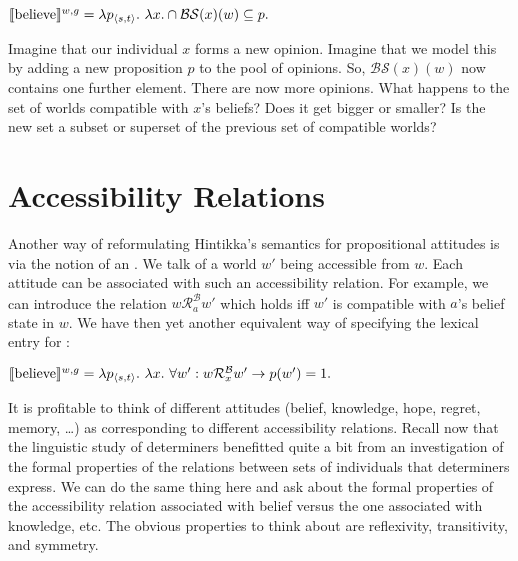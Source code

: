 \ex $\llbracket \mbox{believe} \rrbracket^{w,g} = \lambda p_{\langle s,t \rangle}.\ \lambda x. \cap
\mathcal{BS}(x)(w) \subseteq p.$ \xe

\begin{exercise}
	
	Imagine that our individual $x$ forms a new opinion. Imagine that we model
  this by adding a new proposition $p$ to the pool of opinions. So,
  $\mathcal{BS}(x)(w)$ now contains one further element. There are now more
  opinions. What happens to the set of worlds compatible with $x$'s beliefs?
  Does it get bigger or smaller? Is the new set a subset or superset of the
  previous set of compatible worlds? \eex
\end{exercise}

\section{Accessibility Relations} \label{sec:access-relat}

Another way of reformulating Hintikka's semantics for propositional attitudes is
via the notion of an . We talk of a world $w'$
being accessible from $w$. Each attitude can be associated with such an
accessibility relation. For example, we can introduce the relation
$w\mathcal{R}^{\mathcal{B}}_{a}w'$ which holds iff $w'$ is compatible with $a$'s
belief state in $w$. We have then yet another equivalent way of specifying the
lexical entry for :

\ex $\llbracket \mbox{believe} \rrbracket^{w,g} = \lambda p_{\langle s,t \rangle}.\ \lambda x. \ \forall
w': w\mathcal{R}^{\mathcal{B}}_{x}w' \rightarrow p(w') = 1.$ \xe

It is profitable to think of different attitudes (belief, knowledge, hope,
regret, memory, \dots) as corresponding to different accessibility relations.
Recall now %
%
that the linguistic study of determiners benefitted quite a bit from an
investigation of the formal properties of the relations between sets of
individuals that determiners express. We can do the same thing here and ask
about the formal properties of the accessibility relation associated with belief
versus the one associated with knowledge, etc. The obvious properties to think
about are reflexivity, transitivity, and symmetry.

